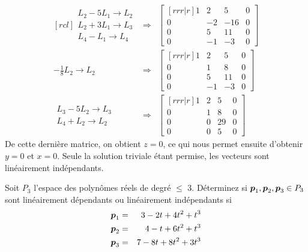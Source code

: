 \begin{exemple}
\[\begin{matrix}[rcl]
\begin{matrix}
L_2 - 5L_1 \rightarrow L_2 \\
L_2 + 3L_1 \rightarrow L_3 \\
L_4 - L_1 \rightarrow L_4
\end{matrix}
&\Rightarrow&
\begin{bmatrix}[rrr|r]
1 & 2 & 5 & 0 \\
0 & -2 & -16 & 0 \\
0 & 5 & 11 & 0 \\
0 & -1 & -3 & 0
\end{bmatrix} \\[20pt]
-\frac{1}{8}L_2 \rightarrow L_2
&\Rightarrow&
\begin{bmatrix}[rrr|r]
1 & 2 & 5 & 0 \\
0 & 1 & 8 & 0 \\
0 & 5 & 11 & 0 \\
0 & -1 & -3 & 0
\end{bmatrix} \\[20pt]
\begin{matrix}
L_3 - 5L_2 \rightarrow L_3 \\
L_4 + L_2 \rightarrow L_2
\end{matrix}
&\Rightarrow&
\begin{bmatrix}[rrr|r]
1 & 2 & 5 & 0 \\
0 & 1 & 8 & 0 \\
0 & 0 & 29 & 0 \\
0 & 0 & 5 & 0
\end{bmatrix}
\end{matrix}
\]
De cette dernière matrice, on obtient $z=0$, ce qui nous permet ensuite d'obtenir $y=0$ et $x=0$.
Seule la solution triviale étant permise, les vecteurs sont linéairement indépendants.
\end{exemple}
\begin{exerciceC}
Soit $P_3$ l'espace des polynômes réels de degré $\leq$ 3. Déterminez si $\boldsymbol{p}_1, \boldsymbol{p}_2, \boldsymbol{p}_3 \in P_3$ sont
linéairement dépendants ou linéairement indépendants si
\begin{eqnarray*}
\boldsymbol{p}_1 &=& 3 - 2t + 4t^2 + t^3 \\
\boldsymbol{p}_2 &=& 4 - t + 6t^2 + t^3 \\
\boldsymbol{p}_3 &=& 7 -8 t + 8t^2 + 3t^3
\end{eqnarray*}
\end{exerciceC}
